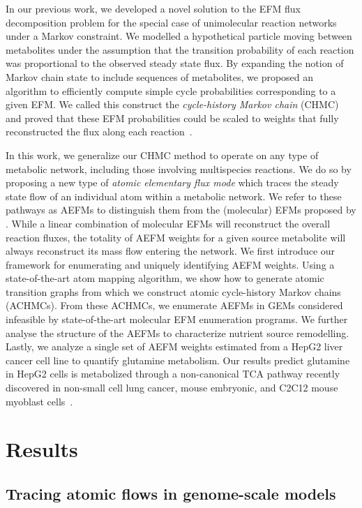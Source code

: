 \documentclass[12pt]{article}
\begin{document}
In our previous work, we developed a novel solution to 
the EFM flux
decomposition problem for the special case of unimolecular reaction
networks under a Markov constraint. We modelled a hypothetical particle
moving between metabolites under the assumption that the transition
probability of each reaction was proportional to the observed steady state
flux. By expanding the notion of Markov chain state to include sequences
of metabolites, we proposed an algorithm to efficiently compute simple
cycle probabilities corresponding to a given EFM. We called this construct
the \emph{cycle-history Markov chain} (CHMC) and proved that these EFM
probabilities could be scaled to weights that fully reconstructed the flux
along each reaction~\citep{ChitpinJustinG2023AMct}.

In this work, we generalize our CHMC method to operate on any type of
metabolic network, including those involving multispecies reactions. We do
so by proposing a new type of \emph{atomic elementary flux mode} which
traces the steady state flow of an individual atom within a metabolic
network. We refer to these pathways as AEFMs to distinguish them from the
(molecular) EFMs proposed by
\citeauthor{SchusterStefan1994Oefm}. While a linear
combination of molecular EFMs will reconstruct the overall reaction fluxes, the
totality of AEFM weights for a given source metabolite will always reconstruct
its mass flow entering the network. We first introduce our framework for
enumerating and uniquely identifying AEFM weights. Using a state-of-the-art
atom mapping algorithm, we show how to generate atomic transition graphs from
which we construct atomic cycle-history Markov chains (ACHMCs). From these
ACHMCs, we enumerate AEFMs in GEMs considered infeasible by state-of-the-art
molecular EFM enumeration programs. We further analyse the structure of the
AEFMs to characterize nutrient source remodelling. Lastly, we analyze a single
set of AEFM weights estimated from a HepG2 liver cancer cell line to quantify
glutamine metabolism. Our results predict glutamine in HepG2 cells is
metabolized through a non-canonical TCA pathway recently discovered in
non-small cell lung cancer, mouse embryonic, and C2C12 mouse myoblast
cells~\citep{ArnoldPaigeK2022Anta}.

\section*{Results}

\subsection*{Tracing atomic flows in genome-scale models} %
\end{document}
